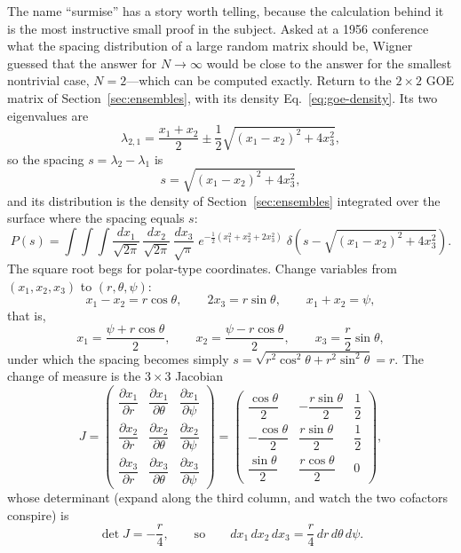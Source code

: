 \documentclass[11pt]{article}
\begin{document}
The name ``surmise'' has a story worth telling, because the calculation
behind it is the most instructive small proof in the subject. Asked at a
1956 conference what the spacing distribution of a large random matrix
should be, Wigner guessed that the answer for $N\to\infty$ would be close
to the answer for the smallest nontrivial case, $N=2$---which can be
computed exactly. Return to the $2\times2$ GOE matrix of
Section~\ref{sec:ensembles}, with its density
Eq.~\eqref{eq:goe-density}. Its two eigenvalues are
\[
\lambda_{2,1}=\frac{x_1+x_2}{2}\pm\frac12\sqrt{(x_1-x_2)^{2}+4x_3^{2}},
\]
so the spacing $s=\lambda_2-\lambda_1$ is
\[
s=\sqrt{(x_1-x_2)^{2}+4x_3^{2}},
\]
and its distribution is the density of Section~\ref{sec:ensembles}
integrated over the surface where the spacing equals $s$:
\begin{equation}
P(s)=\int\!\!\int\!\!\int
\frac{dx_1}{\sqrt{2\pi}}\,\frac{dx_2}{\sqrt{2\pi}}\,\frac{dx_3}{\sqrt{\pi}}
\;e^{-\frac12\left(x_1^{2}+x_2^{2}+2x_3^{2}\right)}\;
\delta\!\left(s-\sqrt{(x_1-x_2)^{2}+4x_3^{2}}\right).
\label{eq:ps-integral}
\end{equation}
The square root begs for polar-type coordinates. Change variables from
$(x_1,x_2,x_3)$ to $(r,\theta,\psi)$:
\[
x_1-x_2=r\cos\theta,\qquad 2x_3=r\sin\theta,\qquad x_1+x_2=\psi,
\]
that is,
\[
x_1=\frac{\psi+r\cos\theta}{2},\qquad
x_2=\frac{\psi-r\cos\theta}{2},\qquad
x_3=\frac{r}{2}\sin\theta,
\]
under which the spacing becomes simply
$s=\sqrt{r^{2}\cos^{2}\theta+r^{2}\sin^{2}\theta}=r$. The change of
measure is the $3\times3$ Jacobian
\[
J=
\begin{pmatrix}
\dfrac{\partial x_1}{\partial r} & \dfrac{\partial x_1}{\partial\theta} & \dfrac{\partial x_1}{\partial\psi}\\[8pt]
\dfrac{\partial x_2}{\partial r} & \dfrac{\partial x_2}{\partial\theta} & \dfrac{\partial x_2}{\partial\psi}\\[8pt]
\dfrac{\partial x_3}{\partial r} & \dfrac{\partial x_3}{\partial\theta} & \dfrac{\partial x_3}{\partial\psi}
\end{pmatrix}
=
\begin{pmatrix}
\dfrac{\cos\theta}{2} & -\dfrac{r\sin\theta}{2} & \dfrac12\\[8pt]
-\dfrac{\cos\theta}{2} & \dfrac{r\sin\theta}{2} & \dfrac12\\[8pt]
\dfrac{\sin\theta}{2} & \dfrac{r\cos\theta}{2} & 0
\end{pmatrix},
\]
whose determinant (expand along the third column, and watch the two
cofactors conspire) is
\[
\det J=-\frac r4,
\qquad\text{so}\qquad
dx_1\,dx_2\,dx_3=\frac r4\,dr\,d\theta\,d\psi .
\]
\end{document}
